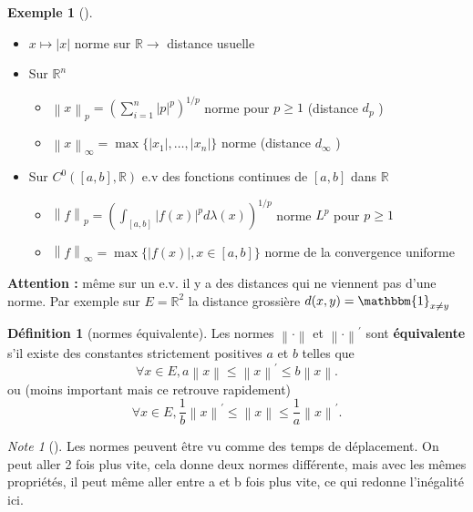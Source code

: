 \documentclass{article}
\theoremstyle{plain}%
\theoremstyle{definition}
\newtheorem{defn}{Définition}[section]
\newtheorem{exmp}{Exemple}[section]
\theoremstyle{remark}
\newtheorem*{note}{Note}
\begin{document}
\begin{exmp}[]
	\begin{itemize}
		\item $ x \mapsto \left| x \right|  $ norme sur $ \mathbb{R} \to $ distance usuelle
		\item Sur $ \mathbb{R}^n $ 
		\begin{itemize}
			\item $ \left\| x \right\| _p = (\sum_{i=1}^{n} \left| p \right| ^p)^{1/p}$ norme pour $ p \geq 1 $ (distance $ d_p $ )
			\item $ \left\| x \right\| _\infty = \max \{\left| x_1 \right| , \dots, \left| x_n \right| \} $ norme (distance $ d_\infty $ )
		\end{itemize} 
		\item Sur $ C^0 ([a,b], \mathbb{R}) $ e.v des fonctions continues de $ [a,b] $ dans $ \mathbb{R} $  
		\begin{itemize}
			\item $ \left\| f \right\| _p = (\int_{[a,b]} \left| f(x) \right| ^p d \lambda (x)) ^{1/p}$ norme $ L^p $ pour $ p \geq 1 $ 
			\item $ \left\| f \right\| _\infty = \max \{ \left| f(x) \right|, x \in [a,b]\} $ norme de la convergence uniforme
		\end{itemize}
	\end{itemize}
\end{exmp}
\textbf{Attention : } même sur un e.v. il y a des distances qui ne viennent pas d'une norme. Par exemple sur $ E=\mathbb{R}^2 $ la distance grossière $ d(x,y) = \mathbbm{1}_{x \neq y} $ 

\begin{defn}[normes équivalente]
	Les normes $ \left\| \cdot  \right\|  $ et $ \left\| \cdot  \right\| ^\prime  $ sont \textbf{équivalente} s'il existe des constantes strictement positives $ a $ et $ b $ telles que 
	\[
		\forall x \in E, a \left\| x \right\| \leq \left\| x \right\| ^\prime \leq b \left\| x \right\| 
	.\]
	ou (moins important mais ce retrouve rapidement)
	\[
		\forall x \in E, \frac{1}{b} \left\| x \right\| ^\prime \leq \left\| x \right\| \leq \frac{1}{a} \left\| x \right\| ^\prime 
	.\]
\end{defn}

\begin{note}[]
	Les normes peuvent être vu comme des temps de déplacement. On peut aller 2 fois plus vite, cela donne deux normes différente, mais avec les mêmes propriétés, il peut même aller entre a et b fois plus vite, ce qui redonne l'inégalité ici. 
\end{note}
\end{document}
